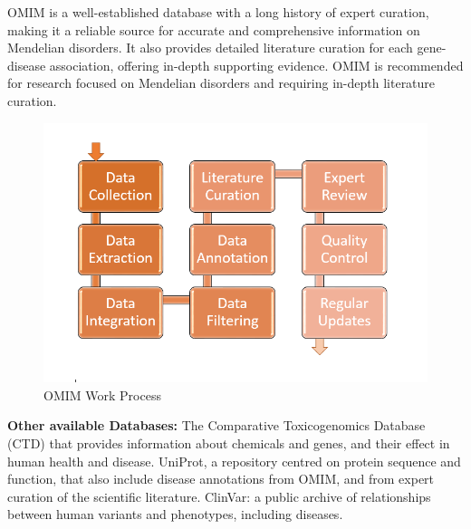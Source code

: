 OMIM is a well-established database with a long history of expert curation, making it a reliable source for accurate and comprehensive information on Mendelian disorders. It also provides detailed literature curation for each gene-disease association, offering in-depth supporting evidence. OMIM is recommended for research focused on Mendelian disorders and requiring in-depth literature curation.  \newline

\begin{figure}[!h]
    \centering
    \includegraphics[width=0.7\linewidth]{OMIM FLOW.PNG}
    \caption{OMIM Work Process}
    \label{fig:OMIM Flow Diagram}
\end{figure}
\vspace{1cm}
\textbf{Other available Databases:}
\newline The Comparative Toxicogenomics Database (CTD) that provides information about chemicals and genes, and their effect in human health and disease.\cite{3}
UniProt, a repository centred on protein sequence and function, that also include disease annotations from OMIM, and from expert curation of the scientific literature.\cite{6} 
ClinVar: a public archive of relationships between human variants and phenotypes, including diseases.


